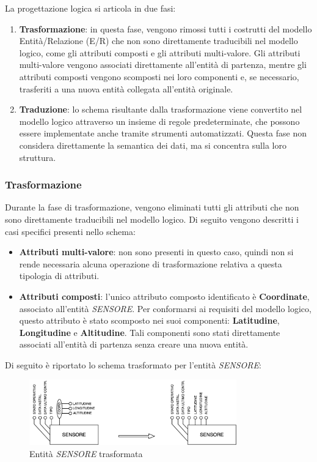 La progettazione logica si articola in due fasi:

\begin{enumerate}
    \item \textbf{Trasformazione}: in questa fase, vengono rimossi tutti i costrutti del modello Entità/Relazione (E/R) che non sono direttamente traducibili nel modello logico, come gli attributi composti e gli attributi multi-valore. Gli attributi multi-valore vengono associati direttamente all’entità di partenza, mentre gli attributi composti vengono scomposti nei loro componenti e, se necessario, trasferiti a una nuova entità collegata all’entità originale.
    \item \textbf{Traduzione}: lo schema risultante dalla trasformazione viene convertito nel modello logico attraverso un insieme di regole predeterminate, che possono essere implementate anche tramite strumenti automatizzati. Questa fase non considera direttamente la semantica dei dati, ma si concentra sulla loro struttura.
\end{enumerate}

\subsubsection{Trasformazione}

Durante la fase di trasformazione, vengono eliminati tutti gli attributi che non sono direttamente traducibili nel modello logico. Di seguito vengono descritti i casi specifici presenti nello schema:

\begin{itemize}
    \item \textbf{Attributi multi-valore}: non sono presenti in questo caso, quindi non si rende necessaria alcuna operazione di trasformazione relativa a questa tipologia di attributi.
    \item \textbf{Attributi composti}: l'unico attributo composto identificato è \textbf{Coordinate}, associato all'entità \textit{SENSORE}. Per conformarsi ai requisiti del modello logico, questo attributo è stato scomposto nei suoi componenti: \textbf{Latitudine}, \textbf{Longitudine} e \textbf{Altitudine}. Tali componenti sono stati direttamente associati all’entità di partenza senza creare una nuova entità.
\end{itemize}

Di seguito è riportato lo schema trasformato per l'entità \textit{SENSORE}:\\

\begin{figure}[h!]
    \centering
    \includegraphics[width=0.8\textwidth]{Media/Trasformazione_Sensore.png}
    \caption{Entità \textit{SENSORE} trasformata}
    \label{fig:schema_portante}
\end{figure}

